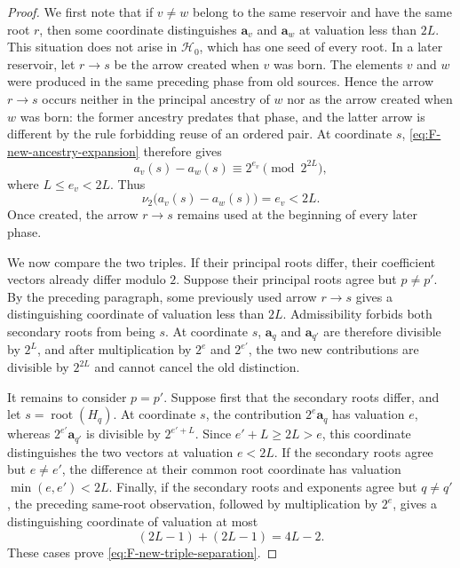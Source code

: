 \documentclass[10pt,a4paper]{amsart}
\theoremstyle{plain}
\theoremstyle{definition}
\begin{document}
\begin{proof}
We first note that if $v\neq w$ belong to the same reservoir and have the same
root $r$, then some coordinate distinguishes $\mathbf a_v$ and $\mathbf a_w$
at valuation less than $2L$.  This situation does not arise in
$\mathcal H_0$, which has one seed of every root.  In a later reservoir, let
$r\to s$ be the arrow created when $v$ was born.  The elements $v$ and $w$
were produced in the same preceding phase from old sources.  Hence the arrow
$r\to s$ occurs neither in the principal ancestry of $w$ nor as the arrow
created when $w$ was born: the former ancestry predates that phase, and the
latter arrow is different by the rule forbidding reuse of an ordered pair.
At coordinate $s$,
\eqref{eq:F-new-ancestry-expansion} therefore gives
$$
 a_v(s)-a_w(s)\equiv2^{e_v}\pmod {2^{2L}},
$$
where $L\leq e_v<2L$.  Thus
$$
 \nu_2\bigl(a_v(s)-a_w(s)\bigr)=e_v<2L.
$$
Once created, the arrow $r\to s$ remains used at the beginning of every later
phase.

We now compare the two triples.  If their principal roots differ, their
coefficient vectors already differ modulo $2$.  Suppose their principal roots
agree but $p\neq p'$.  By the preceding paragraph, some previously used arrow
$r\to s$ gives a distinguishing coordinate of valuation less than $2L$.
Admissibility forbids both secondary roots from being $s$.  At coordinate $s$,
$\mathbf a_q$ and $\mathbf a_{q'}$ are therefore divisible by $2^L$, and after
multiplication by $2^e$ and $2^{e'}$, the two new contributions are divisible
by $2^{2L}$ and cannot cancel the old distinction.

It remains to consider $p=p'$.  Suppose first that the secondary roots differ,
and let $s=\operatorname{root}(H_q)$.  At coordinate $s$, the contribution
$2^e\mathbf a_q$ has valuation $e$, whereas
$2^{e'}\mathbf a_{q'}$ is divisible by $2^{e'+L}$.  Since
$e'+L\geq2L>e$, this coordinate distinguishes the two vectors at valuation
$e<2L$.  If the secondary roots agree but $e\neq e'$, the difference at their common root coordinate has valuation $\min(e,e')<2L$.  Finally, if the secondary roots and exponents agree
but $q\neq q'$, the preceding same-root observation, followed by multiplication
by $2^e$, gives a distinguishing coordinate of valuation at most
$$
 (2L-1)+(2L-1)=4L-2.
$$
These cases prove \eqref{eq:F-new-triple-separation}.
\end{proof}
\end{document}
